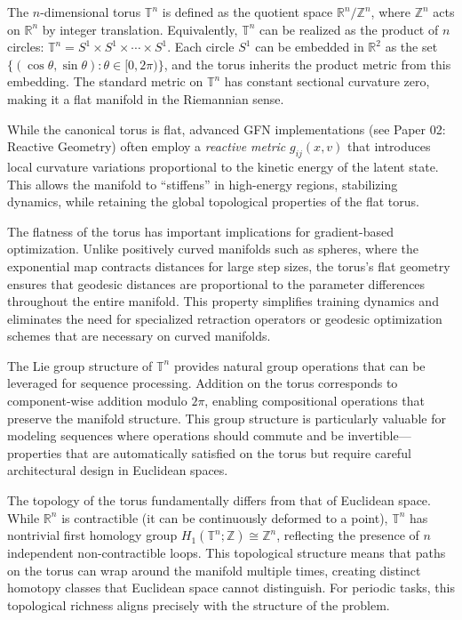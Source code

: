 \documentclass[12pt,letterpaper,twoside]{article}
\newcommand{\R}{\mathbb{R}}
\newcommand{\T}{\mathbb{T}}
\newcommand{\Z}{\mathbb{Z}}
\begin{document}
The $n$-dimensional torus $\T^n$ is defined as the quotient space $\R^n / \Z^n$, where $\Z^n$ acts on $\R^n$ by integer translation. Equivalently, $\T^n$ can be realized as the product of $n$ circles: $\T^n = S^1 \times S^1 \times \cdots \times S^1$. Each circle $S^1$ can be embedded in $\R^2$ as the set $\{(\cos\theta, \sin\theta) : \theta \in [0, 2\pi)\}$, and the torus inherits the product metric from this embedding. The standard metric on $\T^n$ has constant sectional curvature zero, making it a flat manifold in the Riemannian sense.

\begin{remarque}
While the canonical torus is flat, advanced GFN implementations (see Paper 02: Reactive Geometry) often employ a \textit{reactive metric} $g_{ij}(x,v)$ that introduces local curvature variations proportional to the kinetic energy of the latent state. This allows the manifold to ``stiffens'' in high-energy regions, stabilizing dynamics, while retaining the global topological properties of the flat torus.
\end{remarque}

The flatness of the torus has important implications for gradient-based optimization. Unlike positively curved manifolds such as spheres, where the exponential map contracts distances for large step sizes, the torus's flat geometry ensures that geodesic distances are proportional to the parameter differences throughout the entire manifold. This property simplifies training dynamics and eliminates the need for specialized retraction operators or geodesic optimization schemes that are necessary on curved manifolds.

The Lie group structure of $\T^n$ provides natural group operations that can be leveraged for sequence processing. Addition on the torus corresponds to component-wise addition modulo $2\pi$, enabling compositional operations that preserve the manifold structure. This group structure is particularly valuable for modeling sequences where operations should commute and be invertible—properties that are automatically satisfied on the torus but require careful architectural design in Euclidean spaces.

The topology of the torus fundamentally differs from that of Euclidean space. While $\R^n$ is contractible (it can be continuously deformed to a point), $\T^n$ has nontrivial first homology group $H_1(\T^n; \Z) \cong \Z^n$, reflecting the presence of $n$ independent non-contractible loops. This topological structure means that paths on the torus can wrap around the manifold multiple times, creating distinct homotopy classes that Euclidean space cannot distinguish. For periodic tasks, this topological richness aligns precisely with the structure of the problem.
\end{document}
